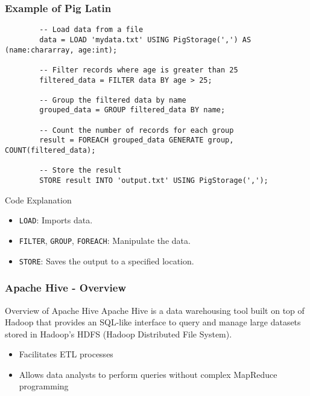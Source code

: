\documentclass[aspectratio=169]{beamer}
\begin{document}
\begin{frame}[fragile]
    \frametitle{Example of Pig Latin}
    \begin{lstlisting}
        -- Load data from a file
        data = LOAD 'mydata.txt' USING PigStorage(',') AS (name:chararray, age:int);
        
        -- Filter records where age is greater than 25
        filtered_data = FILTER data BY age > 25;
        
        -- Group the filtered data by name
        grouped_data = GROUP filtered_data BY name;
        
        -- Count the number of records for each group
        result = FOREACH grouped_data GENERATE group, COUNT(filtered_data);
        
        -- Store the result
        STORE result INTO 'output.txt' USING PigStorage(',');
    \end{lstlisting}
    
    \begin{block}{Code Explanation}
        \begin{itemize}
            \item \texttt{LOAD}: Imports data.
            \item \texttt{FILTER}, \texttt{GROUP}, \texttt{FOREACH}: Manipulate the data.
            \item \texttt{STORE}: Saves the output to a specified location.
        \end{itemize}
    \end{block}
\end{frame}

\begin{frame}[fragile]
    \frametitle{Apache Hive - Overview}
    \begin{block}{Overview of Apache Hive}
        Apache Hive is a data warehousing tool built on top of Hadoop that provides an SQL-like interface to query and manage large datasets stored in Hadoop's HDFS (Hadoop Distributed File System). 
        \begin{itemize}
            \item Facilitates ETL processes
            \item Allows data analysts to perform queries without complex MapReduce programming
        \end{itemize}
    \end{block}
\end{frame}
\end{document}
